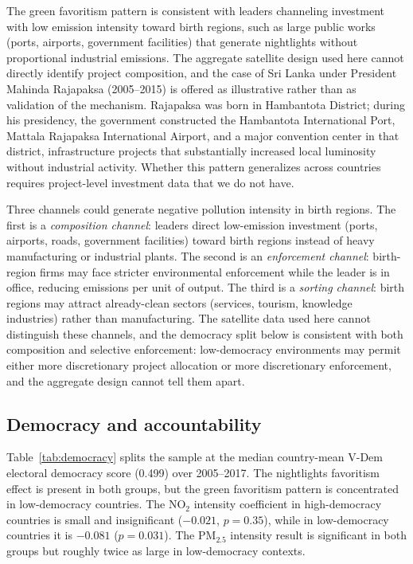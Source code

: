 \documentclass[9pt,twocolumn,twoside]{pnas-new}
\begin{document}
The green favoritism pattern is consistent with leaders channeling investment with low emission intensity toward birth regions, such as large public works (ports, airports, government facilities) that generate nightlights without proportional industrial emissions. The aggregate satellite design used here cannot directly identify project composition, and the case of Sri Lanka under President Mahinda Rajapaksa (2005--2015) is offered as illustrative rather than as validation of the mechanism. Rajapaksa was born in Hambantota District; during his presidency, the government constructed the Hambantota International Port, Mattala Rajapaksa International Airport, and a major convention center in that district, infrastructure projects that substantially increased local luminosity without industrial activity. Whether this pattern generalizes across countries requires project-level investment data that we do not have.

Three channels could generate negative pollution intensity in birth regions. The first is a \emph{composition channel}: leaders direct low-emission investment (ports, airports, roads, government facilities) toward birth regions instead of heavy manufacturing or industrial plants. The second is an \emph{enforcement channel}: birth-region firms may face stricter environmental enforcement while the leader is in office, reducing emissions per unit of output. The third is a \emph{sorting channel}: birth regions may attract already-clean sectors (services, tourism, knowledge industries) rather than manufacturing. The satellite data used here cannot distinguish these channels, and the democracy split below is consistent with both composition and selective enforcement: low-democracy environments may permit either more discretionary project allocation or more discretionary enforcement, and the aggregate design cannot tell them apart.

\subsection*{Democracy and accountability}

Table~\ref{tab:democracy} splits the sample at the median country-mean V-Dem electoral democracy score (0.499) over 2005--2017. The nightlights favoritism effect is present in both groups, but the green favoritism pattern is concentrated in low-democracy countries. The NO$_2$ intensity coefficient in high-democracy countries is small and insignificant ($-0.021$, $p = 0.35$), while in low-democracy countries it is $-0.081$ ($p = 0.031$). The PM$_{2.5}$ intensity result is significant in both groups but roughly twice as large in low-democracy contexts.
\end{document}
